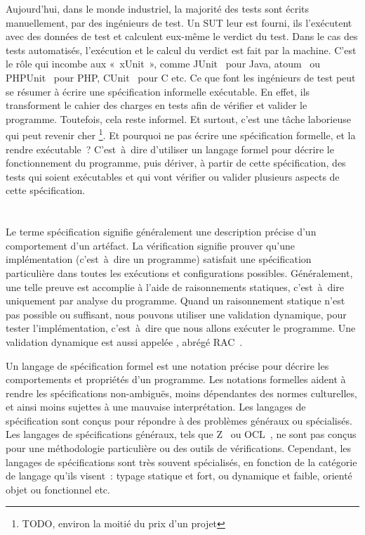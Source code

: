 Aujourd'hui, dans le monde industriel, la majorité des tests sont écrits
{\strong manuellement}, par des ingénieurs de test. Un SUT leur est fourni, ils
l'exécutent avec des données de test et calculent eux-même le verdict du test.
Dans le cas des tests {\strong automatisés}, l'exécution et le calcul du verdict
est fait par la machine. C'est le rôle qui incombe aux 
«~xUnit~», comme JUnit~ pour Java, atoum~ ou
PHPUnit~ pour PHP, CUnit~ pour C etc. Ce que font
les ingénieurs de test peut se résumer à écrire une spécification informelle
exécutable. En effet, ils transforment le cahier des charges en tests afin de
vérifier et valider le programme. Toutefois, cela reste informel. Et surtout,
c'est une tâche laborieuse qui peut revenir cher \footnote{TODO, environ la
moitié du prix d'un projet}. Et pourquoi ne pas écrire une spécification
formelle, et la rendre exécutable~?  C'est~à~dire d'utiliser un langage formel
pour décrire le fonctionnement du programme, puis dériver, à partir de cette
spécification, des tests qui soient exécutables et qui vont vérifier ou valider
plusieurs aspects de cette spécification.

\section{}

Le terme {\strong spécification} signifie généralement une description précise
d'un comportement d'un artéfact. La {\strong vérification} signifie prouver
qu'une implémentation (c'est~à~dire un programme) satisfait une spécification
particulière dans toutes les exécutions et configurations possibles.
Généralement, une telle preuve est accomplie à l'aide de raisonnements
statiques, c'est~à~dire uniquement par analyse du programme. Quand un
raisonnement statique n'est pas possible ou suffisant, nous pouvons utiliser une
{\strong validation} dynamique, pour tester l'implémentation, c'est~à~dire que
nous allons exécuter le programme. Une validation dynamique est aussi appelée
, abrégé RAC~.

Un {\strong langage de spécification} formel est une notation précise pour
décrire les comportements et propriétés d'un programme. Les {\strong notations
formelles} aident à rendre les spécifications non-ambiguës, moins dépendantes
des normes culturelles, et ainsi moins sujettes à une mauvaise interprétation.
Les langages de spécification sont conçus pour répondre à des problèmes généraux
ou spécialisés. Les langages de spécifications généraux, tels que
Z~ ou OCL~, ne sont pas conçus pour une
méthodologie particulière ou des outils de vérifications. Cependant, les
langages de spécifications sont très souvent spécialisés, en fonction de la
catégorie de langage qu'ils visent~: typage statique et fort, ou dynamique et
faible, orienté objet ou fonctionnel etc.

